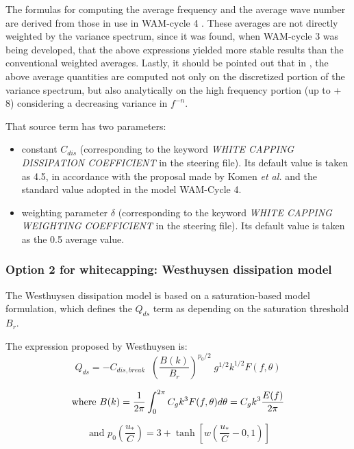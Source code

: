 The formulas for computing the average frequency and the average wave number
are derived from those in use in WAM-cycle 4 \cite{Komen1994}. These averages
are not directly weighted by the variance spectrum, since it was found, when
WAM-cycle 3 \cite {Wamdi1988} was being developed, that the above expressions
yielded more stable results than the conventional weighted averages. Lastly,
it should be pointed out that in \tomawac, the above average quantities are
computed not only on the discretized portion of the variance spectrum, but
also analytically on the high frequency portion (up to + 8) considering a
decreasing variance in $f^{-n}$.

That source term has two parameters:

\begin{itemize}
\item  constant $C_{dis}$ (corresponding to the keyword \textit{WHITE CAPPING
  DISSIPATION COEFFICIENT }in the steering file). Its default value is taken
  as 4.5, in accordance with the proposal made by Komen \textit{et al.}
  \cite{Komen1984} and the standard value adopted in the model WAM-Cycle 4.
\item  weighting parameter $\delta$ (corresponding to the keyword \textit{WHITE
  CAPPING WEIGHTING COEFFICIENT} in the steering file). Its default value is
  taken as the 0.5 average value.
\end{itemize}

\subsubsection{Option 2 for whitecapping: Westhuysen dissipation model}
\label{parag4.3.3.2}
The Westhuysen dissipation model \cite{Westhuys2007} is based on a
saturation-based model formulation, which defines the $Q_{ds}$ term as
depending on the saturation threshold $B_r$.

 The expression proposed by Westhuysen is:
\begin{equation} \label{GrindEQ__4_40_}
  Q_{ds} =-C_{dis,break} \; \; \left(\frac{B(k)}{B_r } \right)^{p_{0} /2} \; g^{1/2}
  k^{1/2} F(f,\theta )
\end{equation}

$$\mbox{where }\displaystyle B(k)=\frac{1}{2\pi } \int _{0}^{2\pi }C_{g} k^{3} F(f,\theta )
d\theta  =C_{g} k^{3} \frac{E(f)}{2\pi } $$

$$\mbox{ and }p_{0} \left(\frac{u_* }{C} \right)=3+\tanh \left[w
  \left(\frac{u_* }{C} -0,1\right)\right]$$

